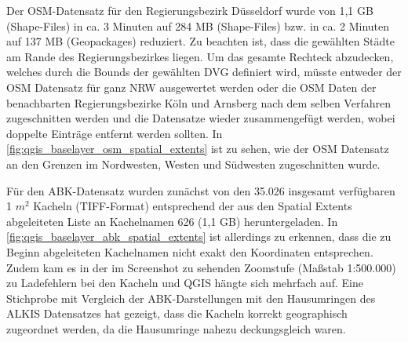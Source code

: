 		Der OSM-Datensatz für den Regierungsbezirk Düsseldorf wurde von 1,1 GB (Shape-Files) in ca. 3 Minuten auf 284 MB (Shape-Files) bzw. in ca. 2 Minuten auf 137 MB (Geopackages) reduziert. Zu beachten ist, dass die gewählten Städte am Rande des Regierungsbezirkes liegen. Um das gesamte Rechteck abzudecken, welches durch die Bounds der gewählten DVG definiert wird, müsste entweder der OSM Datensatz für ganz NRW ausgewertet werden oder die OSM Daten der benachbarten Regierungsbezirke Köln und Arnsberg nach dem selben Verfahren zugeschnitten werden und die Datensatze wieder zusammengefügt werden, wobei doppelte Einträge entfernt werden sollten. In \autoref{fig:qgis_baselayer_osm_spatial_extents} ist zu sehen, wie der OSM Datensatz an den Grenzen im Nordwesten, Westen und Südwesten zugeschnitten wurde. 
				
		Für den ABK-Datensatz wurden zunächst von den 35.026 insgesamt verfügbaren 1 $m^2$ Kacheln (TIFF-Format) entsprechend der aus den Spatial Extents abgeleiteten Liste an Kachelnamen 626 (1,1 GB) heruntergeladen. In \autoref{fig:qgis_baselayer_abk_spatial_extents} ist allerdings zu erkennen, dass die zu Beginn abgeleiteten Kachelnamen nicht exakt den Koordinaten entsprechen. Zudem kam es in der im Screenshot zu sehenden Zoomstufe (Maßstab 1:500.000) zu Ladefehlern bei den Kacheln und QGIS hängte sich mehrfach auf. Eine Stichprobe mit Vergleich der ABK-Darstellungen mit den Hausumringen des ALKIS Datensatzes hat gezeigt, dass die Kacheln korrekt geographisch zugeordnet werden, da die Hausumringe nahezu deckungsgleich waren. \\
				
